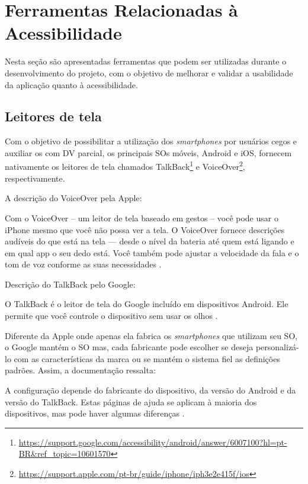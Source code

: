 \section{Ferramentas Relacionadas à Acessibilidade}
Nesta seção são apresentadas ferramentas que podem ser utilizadas durante o desenvolvimento do projeto, com o objetivo de melhorar e validar a usabilidade
da aplicação quanto à acessibilidade.

\subsection{Leitores de tela}

Com o objetivo de possibilitar a utilização dos \emph{smartphones} por usuários cegos e auxiliar os com DV parcial, os principais SOs móveis, Android e iOS,
fornecem nativamente os leitores de tela chamados TalkBack\footnote{\url{https://support.google.com/accessibility/android/answer/6007100?hl=pt-BR&ref_topic=10601570}}
e VoiceOver\footnote{\url{https://support.apple.com/pt-br/guide/iphone/iph3e2e415f/ios}}, respectivamente.

A descrição do VoiceOver pela Apple:

\begin{citacao}
    Com o VoiceOver – um leitor de tela baseado em gestos – você pode usar o iPhone mesmo que você não possa ver a tela.
    O VoiceOver fornece descrições audíveis do que está na tela — desde o nível da bateria até quem está ligando e em qual
    app o seu dedo está. Você também pode ajustar a velocidade da fala e o tom de voz conforme as suas necessidades \cite{VoiceOver2021}.
\end{citacao}

Descrição do TalkBack pelo Google:

\begin{citacao}
    O TalkBack é o leitor de tela do Google incluído em dispositivos Android.
    Ele permite que você controle o dispositivo sem usar os olhos \cite{TalkBak2021}.
\end{citacao}

Diferente da Apple onde apenas ela fabrica os \emph{smartphones} que utilizam seu SO, o Google mantém o SO mas, cada fabricante pode escolher se
deseja personalizá-lo com as características da marca ou se mantém o sistema fiel as definições padrões. Assim, a documentação ressalta:

\begin{citacao}
    A configuração depende do fabricante do dispositivo, da versão do Android e da versão do TalkBack.
    Estas páginas de ajuda se aplicam à maioria dos dispositivos, mas pode haver algumas diferenças \cite{TalkBak2021}.
\end{citacao}

